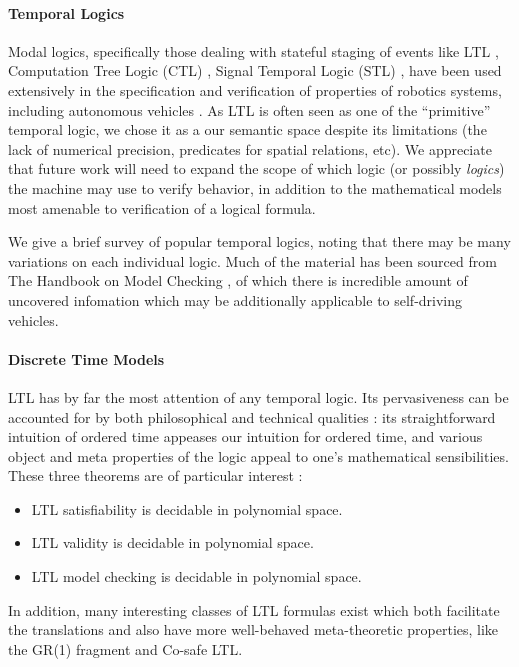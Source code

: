 \documentclass{article}
\begin{document}
\paragraph{Temporal Logics}

Modal logics, specifically those dealing with stateful staging of events like
LTL \cite{ltl95}, Computation Tree Logic (CTL) \cite{yooCTL}, Signal Temporal
Logic (STL) \cite{stlAut}, have been used extensively in the specification and
verification of properties of robotics systems, including autonomous vehicles .
As LTL is often seen as one of the ``primitive'' temporal logic, we chose it as
a our semantic space despite its limitations (the lack of numerical precision,
predicates for spatial relations, etc). We appreciate that future work will need
to expand the scope of which logic (or possibly \emph{logics}) the machine may
use to verify behavior, in addition to the mathematical models most amenable to
verification of a logical formula.

We give a brief survey of popular temporal logics, noting that there may be many
variations on each individual logic. Much of the material has been sourced from
The Handbook on Model Checking \cite{Piterman2018}, of which there is incredible
amount of uncovered infomation which may be additionally applicable to
self-driving vehicles.

\paragraph{Discrete Time Models}

LTL has by far the most attention of any temporal logic. Its pervasiveness can be accounted for by both philosophical and technical qualities : its straightforward intuition of ordered time appeases our intuition for ordered time, and various object and meta properties of the logic appeal to one's mathematical sensibilities. These three theorems are of particular interest :

\begin{itemize}
\item LTL satisfiability is decidable in polynomial space.
\item LTL validity is decidable in polynomial space.
\item LTL model checking is decidable in polynomial space.
\end{itemize}

In addition, many interesting classes of LTL formulas exist which both facilitate the translations and also have more well-behaved meta-theoretic properties, like the GR(1) fragment and Co-safe LTL.
\end{document}
